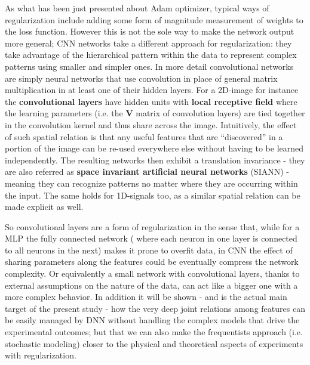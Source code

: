 As what has been just presented about Adam optimizer, typical ways of regularization include adding some form of magnitude measurement of weights to the loss function. However this is not the sole way to make the network output more general; \acl{CNN} networks take a different approach for regularization: they take advantage of the hierarchical pattern within the data to represent complex patterns using smaller and simpler ones. 
In more detail convolutional networks are simply neural networks that use convolution in place of general matrix multiplication in at least one of their hidden layers.
For a 2D-image for instance the \textbf{convolutional layers} have hidden units with \textbf{local receptive field} where the learning parameters (i.e. the $\bm{V}$ matrix of convolution layers) are tied together in the convolution kernel and thus share across the image. Intuitively, the effect of such spatial relation is that any useful features that are “discovered” in a portion
of the image can be re-used everywhere else without having to be learned independently. The resulting networks then exhibit a translation invariance - they are also referred as \textbf{space invariant artificial neural networks} (SIANN) - meaning they can recognize patterns no matter where they are occurring within the input.
The same holds for 1D-signals too, as a similar spatial relation can be made explicit as well.

So convolutional layers are a form of regularization in the sense that, while for a \ac{MLP} the fully connected network ( where each neuron in one layer is connected to all neurons in the next) makes it prone to overfit data, in \ac{CNN} the effect of sharing parameters along the features could be eventually compress the network complexity. Or equivalently a small network with convolutional layers, thanks to external assumptions on the nature of the data, can act like a bigger one with a more complex behavior.
%
In addition it will be shown - and is the actual main target of the present study - how the very deep joint relations among features can be easily managed by \ac{DNN} without handling the complex models that drive the experimental outcomes; but that we can also make the frequentists approach (i.e. stochastic modeling) closer to the physical and theoretical aspects of experiments with regularization.

